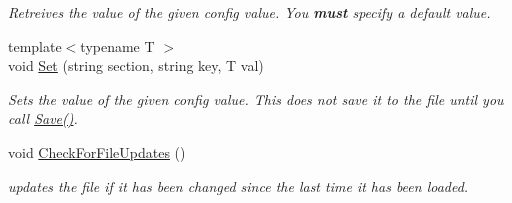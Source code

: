 \begin{DoxyCompactItemize}
\begin{DoxyCompactList}\small\item\em \-Retreives the value of the given config value. \-You {\bfseries must} specify a default value. \end{DoxyCompactList}\item 
\hypertarget{class_config_a5d9210c988409c7a95c1c9d0c293daa3}{{\footnotesize template$<$typename T $>$ }\\void \hyperlink{class_config_a5d9210c988409c7a95c1c9d0c293daa3}{\-Set} (string section, string key, \-T val)}\label{class_config_a5d9210c988409c7a95c1c9d0c293daa3}

\begin{DoxyCompactList}\small\item\em \-Sets the value of the given config value. \-This does not save it to the file until you call \hyperlink{class_config_ab04c51d227c1457404ae9dadc1c576e1}{\-Save()}. \end{DoxyCompactList}\item 
\hypertarget{class_config_a2535a12fc99acdf6d389311955ba8af9}{void \hyperlink{class_config_a2535a12fc99acdf6d389311955ba8af9}{\-Check\-For\-File\-Updates} ()}\label{class_config_a2535a12fc99acdf6d389311955ba8af9}

\begin{DoxyCompactList}\small\item\em updates the file if it has been changed since the last time it has been loaded. \end{DoxyCompactList}\end{DoxyCompactItemize}
